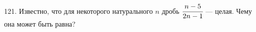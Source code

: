 121. Известно, что для некоторого натурального $n$ дробь $\cfrac{n - 5}{2n - 1}$ --- целая. Чему она может быть
равна?\\
